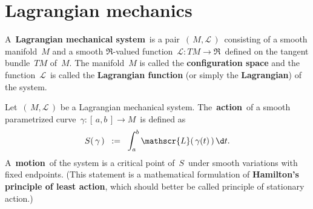 

\section{Lagrangian mechanics}
\setcounter{theorem}{0}
\setcounter{equation}{0}


\renewcommand{\theenumi}{\roman{enumi}}
\renewcommand{\labelenumi}{\textnormal{(\theenumi)}$\;\;$}


\begin{definition}
\mbox{}
\vskip 0.1cm
\noindent
A \,\textbf{Lagrangian mechanical system}\, is a pair \,$\left(\,M,\mathscr{L}\,\right)$\,
consisting of a smooth manifold \,$M$ and a smooth $\Re$-valued function
\,$\mathscr{L} : TM \longrightarrow \Re$\,
defined on the tangent bundle \,$TM$ of \,$M$.
The manifold \,$M$ is called the \textbf{configuration space} and
the function \,$\mathscr{L}$\, is called the \textbf{Lagrangian function}
(or simply the \textbf{Lagrangian}) of the system.
\end{definition}


\vskip 0.5cm
\begin{definition}
\mbox{}
\vskip 0.1cm
\noindent
Let \,$\left(\,M,\mathscr{L}\,\right)$ be a Lagrangian mechanical system.
The \,\textbf{action}\, of a smooth parametrized curve
\,$\gamma : [\,a, b\,] \longrightarrow M$\,
is defined as
\begin{equation*}
S(\,\gamma\,)
\;\; := \;\;
\int_{a}^{b}
\mathscr{L}(\,\gamma(t)\,)\,\d t.
\end{equation*}
A \,\textbf{motion}\, of the system is a critical point of \,$S$\,
under smooth variations with fixed endpoints.
(This statement is a mathematical formulation of
\textbf{Hamilton's principle of least action},
which should better be called principle of {\color{red}stationary} action.)
\end{definition}


